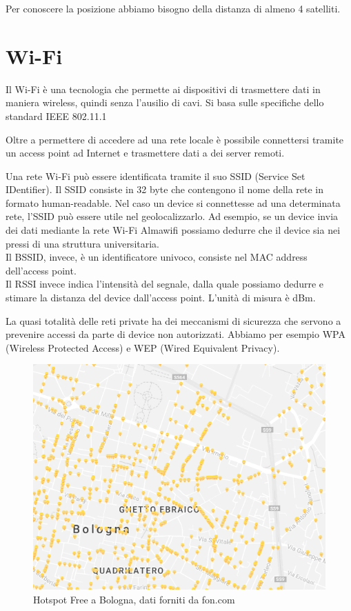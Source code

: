 \documentclass[12pt,a4paper,openright,twoside]{report}
\begin{document}
Per conoscere la posizione abbiamo bisogno della distanza di almeno 4 satelliti.

\section {Wi-Fi}
Il Wi-Fi è una tecnologia che permette ai dispositivi di trasmettere dati in maniera wireless, quindi senza l'ausilio di cavi. Si basa sulle specifiche dello standard IEEE 802.11.1

Oltre a permettere di accedere ad una rete locale è possibile connettersi tramite un access point ad Internet e trasmettere dati a dei server remoti.

Una rete Wi-Fi può essere identificata tramite il suo SSID (Service Set IDentifier). Il SSID consiste in 32 byte che contengono il nome della rete in formato human-readable. Nel caso un device si connettesse ad una determinata rete, l'SSID può essere utile nel geolocalizzarlo. 
Ad esempio, se un device invia dei dati mediante la rete Wi-Fi Almawifi possiamo dedurre che il device sia nei pressi di una struttura universitaria.\\
Il BSSID, invece, è un identificatore univoco, consiste nel MAC address dell'access point. \\
Il RSSI invece indica l'intensità del segnale, dalla quale possiamo dedurre e stimare la distanza del device dall'access point. L'unità di misura è dBm.

La quasi totalità delle reti private ha dei meccanismi di sicurezza che servono a prevenire accessi da parte di device non autorizzati. 
Abbiamo per esempio WPA (Wireless Protected Access) e WEP (Wired Equivalent Privacy).

\begin{figure}[h!]
\centering 
\includegraphics[scale=0.6]{fig7} 
\caption{Hotspot Free a Bologna, dati forniti da fon.com \cite{K16}} 
\end{figure}
\end{document}
